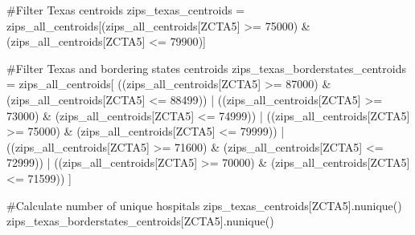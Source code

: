 \documentclass[
  letterpaper,
  DIV=11,
  numbers=noendperiod]{scrartcl}
\newenvironment{Shaded}{\begin{snugshade}}{\end{snugshade}}
\newcommand{\CommentTok}[1]{\textcolor[rgb]{0.37,0.37,0.37}{#1}}
\newcommand{\DecValTok}[1]{\textcolor[rgb]{0.68,0.00,0.00}{#1}}
\newcommand{\NormalTok}[1]{\textcolor[rgb]{0.00,0.23,0.31}{#1}}
\newcommand{\OperatorTok}[1]{\textcolor[rgb]{0.37,0.37,0.37}{#1}}
\newcommand{\StringTok}[1]{\textcolor[rgb]{0.13,0.47,0.30}{#1}}
\begin{document}
\begin{Shaded}
\begin{Highlighting}[]
\CommentTok{\#Filter Texas centroids}
\NormalTok{zips\_texas\_centroids }\OperatorTok{=}\NormalTok{ zips\_all\_centroids[(zips\_all\_centroids[}\StringTok{\textquotesingle{}ZCTA5\textquotesingle{}}\NormalTok{] }\OperatorTok{\textgreater{}=} \DecValTok{75000}\NormalTok{) }\OperatorTok{\&}\NormalTok{ (zips\_all\_centroids[}\StringTok{\textquotesingle{}ZCTA5\textquotesingle{}}\NormalTok{] }\OperatorTok{\textless{}=} \DecValTok{79900}\NormalTok{)]}

\CommentTok{\#Filter Texas and bordering states centroids}
\NormalTok{zips\_texas\_borderstates\_centroids }\OperatorTok{=}\NormalTok{ zips\_all\_centroids[}
\NormalTok{    ((zips\_all\_centroids[}\StringTok{\textquotesingle{}ZCTA5\textquotesingle{}}\NormalTok{] }\OperatorTok{\textgreater{}=} \DecValTok{87000}\NormalTok{) }\OperatorTok{\&}\NormalTok{ (zips\_all\_centroids[}\StringTok{\textquotesingle{}ZCTA5\textquotesingle{}}\NormalTok{] }\OperatorTok{\textless{}=} \DecValTok{88499}\NormalTok{)) }\OperatorTok{|}
\NormalTok{    ((zips\_all\_centroids[}\StringTok{\textquotesingle{}ZCTA5\textquotesingle{}}\NormalTok{] }\OperatorTok{\textgreater{}=} \DecValTok{73000}\NormalTok{) }\OperatorTok{\&}\NormalTok{ (zips\_all\_centroids[}\StringTok{\textquotesingle{}ZCTA5\textquotesingle{}}\NormalTok{] }\OperatorTok{\textless{}=} \DecValTok{74999}\NormalTok{)) }\OperatorTok{|}
\NormalTok{    ((zips\_all\_centroids[}\StringTok{\textquotesingle{}ZCTA5\textquotesingle{}}\NormalTok{] }\OperatorTok{\textgreater{}=} \DecValTok{75000}\NormalTok{) }\OperatorTok{\&}\NormalTok{ (zips\_all\_centroids[}\StringTok{\textquotesingle{}ZCTA5\textquotesingle{}}\NormalTok{] }\OperatorTok{\textless{}=} \DecValTok{79999}\NormalTok{)) }\OperatorTok{|}
\NormalTok{    ((zips\_all\_centroids[}\StringTok{\textquotesingle{}ZCTA5\textquotesingle{}}\NormalTok{] }\OperatorTok{\textgreater{}=} \DecValTok{71600}\NormalTok{) }\OperatorTok{\&}\NormalTok{ (zips\_all\_centroids[}\StringTok{\textquotesingle{}ZCTA5\textquotesingle{}}\NormalTok{] }\OperatorTok{\textless{}=} \DecValTok{72999}\NormalTok{)) }\OperatorTok{|}
\NormalTok{    ((zips\_all\_centroids[}\StringTok{\textquotesingle{}ZCTA5\textquotesingle{}}\NormalTok{] }\OperatorTok{\textgreater{}=} \DecValTok{70000}\NormalTok{) }\OperatorTok{\&}\NormalTok{ (zips\_all\_centroids[}\StringTok{\textquotesingle{}ZCTA5\textquotesingle{}}\NormalTok{] }\OperatorTok{\textless{}=} \DecValTok{71599}\NormalTok{))}
\NormalTok{]}

\CommentTok{\#Calculate number of unique hospitals}
\NormalTok{zips\_texas\_centroids[}\StringTok{\textquotesingle{}ZCTA5\textquotesingle{}}\NormalTok{].nunique()}
\NormalTok{zips\_texas\_borderstates\_centroids[}\StringTok{\textquotesingle{}ZCTA5\textquotesingle{}}\NormalTok{].nunique()}
\end{Highlighting}
\end{Shaded}
\end{document}
